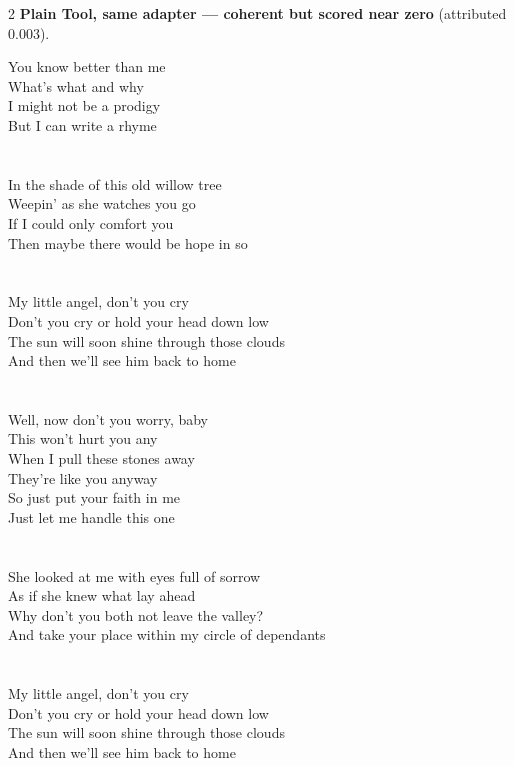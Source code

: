 \begin{multicols}{2}
\nopagebreak\noindent\textbf{Plain Tool, same adapter --- coherent but scored near zero} (attributed 0.003).\par\nopagebreak\vspace{4pt}
{\footnotesize\itshape\raggedright
You know better than me \\
What's what and why \\
I might not be a prodigy \\
But I can write a rhyme \\
\mbox{} \\
\mbox{} \\
In the shade of this old willow tree \\
Weepin' as she watches you go \\
If I could only comfort you \\
Then maybe there would be hope in so \\
\mbox{} \\
\mbox{} \\
My little angel, don't you cry \\
Don't you cry or hold your head down low \\
The sun will soon shine through those clouds \\
And then we'll see him back to home \\
\mbox{} \\
\mbox{} \\
Well, now don't you worry, baby \\
This won't hurt you any \\
When I pull these stones away \\
They're like you anyway \\
So just put your faith in me \\
Just let me handle this one \\
\mbox{} \\
\mbox{} \\
She looked at me with eyes full of sorrow \\
As if she knew what lay ahead \\
Why don't you both not leave the valley? \\
And take your place within my circle of dependants \\
\mbox{} \\
\mbox{} \\
My little angel, don't you cry \\
Don't you cry or hold your head down low \\
The sun will soon shine through those clouds \\
And then we'll see him back to home\par}
\medskip


\end{multicols}
